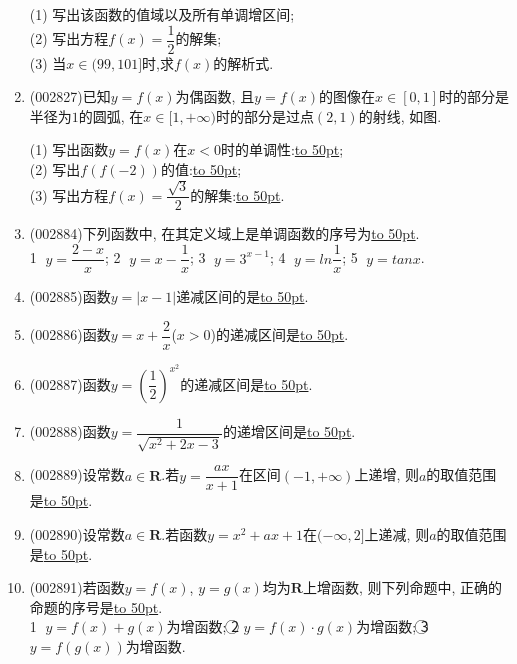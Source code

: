 \documentclass[10pt,a4paper]{article}
\newcommand{\blank}[1]{\underline{\hbox to #1pt{}}}
\begin{document}
\begin{enumerate}[1.]
(1) 写出该函数的值域以及所有单调增区间;\\ 
(2) 写出方程$f(x)=\dfrac{1}{2}$的解集;\\ 
(3) 当$x\in(99,101]$时,求$f(x)$的解析式.
\item {\tiny (002827)}已知$y=f(x)$为偶函数, 且$y=f(x)$的图像在$x\in [0,1]$时的部分是半径为$1$的圆弧, 在$x\in [1,+\infty)$时的部分是过点$(2,1)$的射线, 如图.\\
\begin{center}
\end{center}
(1) 写出函数$y=f(x)$在$x<0$时的单调性:\blank{50};\\
(2) 写出$f(f(-2))$的值:\blank{50};\\
(3) 写出方程$f(x)=\dfrac{\sqrt 3}2$的解集:\blank{50}.
\item {\tiny (002884)}下列函数中, 在其定义域上是单调函数的序号为\blank{50}.\\
\textcircled{1} $y=\dfrac{2-x}x$; \textcircled{2} $y=x-\dfrac 1x$; \textcircled{3} $y={3^{x-1}}$; \textcircled{4} $y=ln\dfrac 1x$; \textcircled{5} $y=tanx$.
\item {\tiny (002885)}函数$y=|x-1|$递减区间的是\blank{50}.
\item {\tiny (002886)}函数$y=x+\dfrac 2x$($x>0$)的递减区间是\blank{50}.
\item {\tiny (002887)}函数$y=(\dfrac 12)^{x^2}$的递减区间是\blank{50}.
\item {\tiny (002888)}函数$y=\dfrac 1{\sqrt{x^2+2x-3}}$的递增区间是\blank{50}.
\item {\tiny (002889)}设常数$a\in \mathbf{R}$.若$y=\dfrac{ax}{x+1}$在区间$(-1,+\infty)$上递增, 则$a$的取值范围是\blank{50}.
\item {\tiny (002890)}设常数$a\in \mathbf{R}$.若函数$y=x^2+ax+1$在$(-\infty,2]$上递减, 则$a$的取值范围是\blank{50}.
\item {\tiny (002891)}若函数$y=f(x)$, $y=g(x)$均为$\mathbf{R}$上增函数, 则下列命题中, 正确的命题的序号是\blank{50}.\\
\textcircled{1} $y=f(x)+g(x)$为增函数; \textcircled{2} $y=f(x)\cdot g(x)$为增函数; \textcircled{3} $y=f(g(x))$为增函数.

\end{enumerate}
\end{document}
